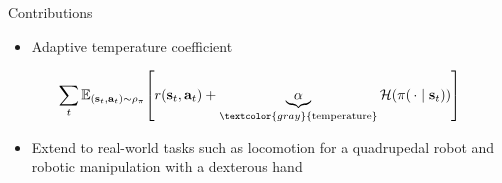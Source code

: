\begin{frame}{Contributions}
\begin{itemize}
    \item Adaptive temperature coefficient
\end{itemize}
\[
\sum_{t} \mathbb{E}_{(\mathbf{s}_t, \mathbf{a}_t) \sim \rho_\pi}\!\left[ r(\mathbf{s}_t, \mathbf{a}_t) + \underbrace{\alpha}_{\textcolor{gray}{\text{temperature}}} \mathcal{H}(\pi(\,\cdot \mid \mathbf{s}_t)) \right]
\]
\begin{itemize}
    \item Extend to real-world tasks such as locomotion for a quadrupedal robot and robotic manipulation with a dexterous hand
\end{itemize}
\end{frame}
